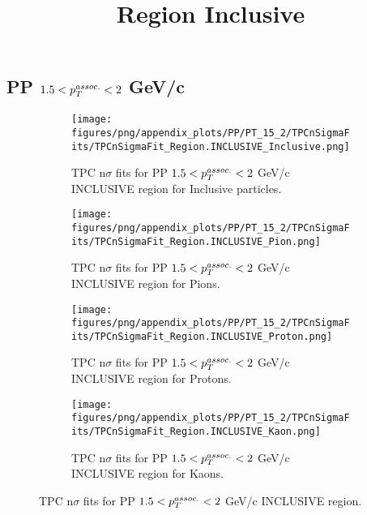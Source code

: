     
            \subsection{PP $1.5 < \pTassoc < 2$ GeV/c}
            \begin{figure}[H]
                \title{Region Inclusive}
                \begin{subfigure}[b]{0.5\textwidth}
                    \centering
                    \texttt{[image: figures/png/appendix\_plots/PP/PT\_15\_2/TPCnSigmaFits/TPCnSigmaFit\_Region.INCLUSIVE\_Inclusive.png]}
                    \caption{TPC n$\sigma$ fits for PP $1.5 < \pTassoc < 2$ GeV/c INCLUSIVE region for Inclusive particles.}
                    \label{fig:appendix_PP_$1.5 < \pTassoc < 2$ GeV/c_INCLUSIVE_Inclusive}
                \end{subfigure}
                \begin{subfigure}[b]{0.5\textwidth}
                    \centering
                    \texttt{[image: figures/png/appendix\_plots/PP/PT\_15\_2/TPCnSigmaFits/TPCnSigmaFit\_Region.INCLUSIVE\_Pion.png]}
                    \caption{TPC n$\sigma$ fits for PP $1.5 < \pTassoc < 2$ GeV/c INCLUSIVE region for Pions.}
                    \label{fig:appendix_PP_$1.5 < \pTassoc < 2$ GeV/c_INCLUSIVE_Pion}
                \end{subfigure}
                \begin{subfigure}[b]{0.5\textwidth}
                    \centering
                    \texttt{[image: figures/png/appendix\_plots/PP/PT\_15\_2/TPCnSigmaFits/TPCnSigmaFit\_Region.INCLUSIVE\_Proton.png]}
                    \caption{TPC n$\sigma$ fits for PP $1.5 < \pTassoc < 2$ GeV/c INCLUSIVE region for Protons.}
                    \label{fig:appendix_PP_$1.5 < \pTassoc < 2$ GeV/c_INCLUSIVE_Proton}
                \end{subfigure}
                \begin{subfigure}[b]{0.5\textwidth}
                    \centering
                    \texttt{[image: figures/png/appendix\_plots/PP/PT\_15\_2/TPCnSigmaFits/TPCnSigmaFit\_Region.INCLUSIVE\_Kaon.png]}
                    \caption{TPC n$\sigma$ fits for PP $1.5 < \pTassoc < 2$ GeV/c INCLUSIVE region for Kaons.}
                    \label{fig:appendix_PP_$1.5 < \pTassoc < 2$ GeV/c_INCLUSIVE_Kaon}
                \end{subfigure}
                \caption{TPC n$\sigma$ fits for PP $1.5 < \pTassoc < 2$ GeV/c INCLUSIVE region.}
                \label{fig:appendix_PP_$1.5 < \pTassoc < 2$ GeV/c_INCLUSIVE}
            \end{figure}
